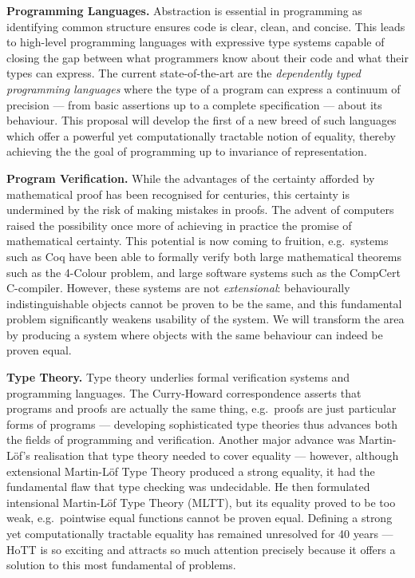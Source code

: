 \documentclass[a4paper,11pt]{article}
\newcommand{\eg}{{e.g.}\ }
\begin{document}
{\bf Programming Languages.} Abstraction is essential in programming
as identifying common structure ensures code is clear, clean, and
concise. This leads to high-level programming languages with
expressive type systems capable of closing the gap between what
programmers know about their code and what their types can express.
The current state-of-the-art are the {\em dependently typed
  programming languages} where the type of a program can express a
continuum of precision --- from basic assertions up to a complete
specification --- about its behaviour. This proposal will develop the
first of a new breed of such languages which offer a powerful yet
computationally tractable notion of equality, thereby achieving the
the goal of programming up to invariance of representation.


{\bf Program Verification.} While the advantages of the certainty
afforded by mathematical proof has been recognised for centuries, this
certainty is undermined by the risk of making mistakes in
proofs. The advent of computers raised the possibility once more of
achieving in practice the promise of mathematical certainty. This
potential is now coming to fruition, \eg systems such as Coq have been
able to formally verify both large mathematical theorems such as the
4-Colour problem, and large software systems such as the CompCert
C-compiler. However, these systems are not {\em extensional}:
behaviourally indistinguishable objects cannot be proven to be the
same, and this fundamental problem significantly weakens usability of the
system. We will transform the area by producing a system where
objects with the same behaviour can indeed be proven equal.


{\bf Type Theory.} Type theory underlies formal verification systems
and programming languages. The Curry-Howard correspondence asserts
that programs and proofs are actually the same thing, \eg proofs are
just particular forms of programs --- developing sophisticated type
theories thus advances both the fields of programming and
verification. Another major advance was Martin-L\"of's realisation
that type theory needed to cover equality --- however, although
extensional Martin-L\"of Type Theory produced a strong equality, it
had the fundamental flaw that type checking was undecidable. He then
formulated intensional Martin-L\"of Type Theory (MLTT), but its
equality proved to be too weak, \eg pointwise equal functions cannot
be proven equal. Defining a strong yet computationally tractable
equality has remained unresolved for 40 years --- HoTT is so exciting
and attracts so much attention precisely because it offers a solution
to this most fundamental of problems.
\end{document}
